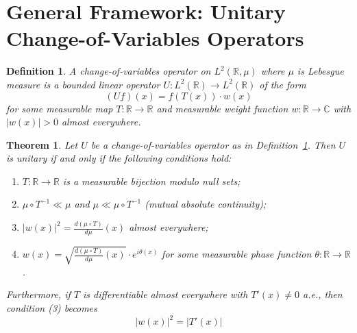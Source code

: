 \documentclass{article}
\newcommand{\tmem}[1]{{\em #1\/}}
\newtheorem{definition}{Definition}
\newtheorem{theorem}{Theorem}
\begin{document}
\section{General Framework: Unitary Change-of-Variables Operators}

\begin{definition}
  \label{def:cov-operator}A {\tmem{change-of-variables operator}} on $L^2
  (\mathbb{R}, \mu)$ where $\mu$ is Lebesgue measure is a bounded linear
  operator $U : L^2 (\mathbb{R}) \to L^2 (\mathbb{R})$ of the form
  \begin{equation}
    (Uf) (x) = f (T (x)) \cdot w (x)
  \end{equation}
  for some measurable map $T : \mathbb{R} \to \mathbb{R}$ and measurable
  weight function $w : \mathbb{R} \to \mathbb{C}$ with $|w (x) | > 0$ almost
  everywhere.
\end{definition}

\begin{theorem}
  \label{thm:main}Let $U$ be a change-of-variables operator as in
  Definition~\ref{def:cov-operator}. Then $U$ is unitary if and only if the
  following conditions hold:
  \begin{enumerate}
    \item $T : \mathbb{R} \to \mathbb{R}$ is a measurable bijection modulo
    null sets;
    
    \item $\mu \circ T^{- 1} \ll \mu$ and $\mu \ll \mu \circ T^{- 1}$ (mutual
    absolute continuity);
    
    \item $|w (x) |^2 = \frac{d (\mu \circ T)}{d \mu} (x)$ almost everywhere;
    
    \item $w (x) = \sqrt{\frac{d (\mu \circ T)}{d \mu} (x)} \cdot e^{i \theta
    (x)}$ for some measurable phase function $\theta : \mathbb{R} \to
    \mathbb{R}$.
  \end{enumerate}
  Furthermore, if $T$ is differentiable almost everywhere with $T' (x) \neq 0$
  a.e., then condition (3) becomes
  \begin{equation}
    |w (x) |^2 = |T' (x) |
  \end{equation}
\end{theorem}
\end{document}
